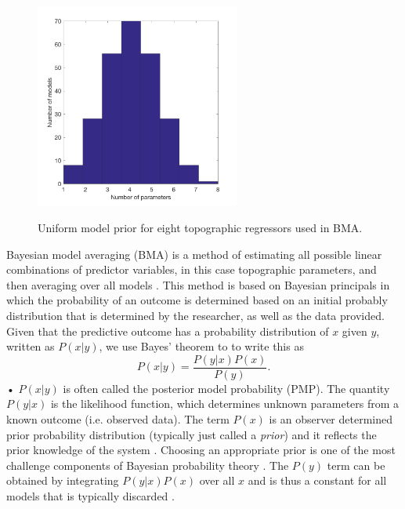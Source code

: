 \documentclass{sfuthesis}
\begin{document}
\begin{figure}
	\centering
	\includegraphics[width = 0.6\textwidth]{DistributionOfNumParams_topoRegress.png}\\
	\caption{Uniform model prior for eight topographic regressors used in BMA.}
	\label{fig:uni_model_prior}
\end{figure}

Bayesian model averaging (BMA) is a method of estimating all possible linear combinations of predictor variables, in this case topographic parameters, and then averaging over all models \citep{Raftery1997, Wasserman2000, Raftery2005}.  This method is based on Bayesian principals in which the probability of an outcome is determined based on an initial probably distribution that is determined by the researcher, as well as the data provided. Given that the predictive outcome has a probability distribution of $x$ given $y$, written as $P(x|y)$, we use Bayes' theorem to to write this as
\begin{equation}
P(x|y) = \frac{P(y|x)P(x)}{P(y)}.
\end{equation}•
$P(x|y)$ is often called the posterior model probability (PMP). The quantity $P(y|x)$ is the likelihood function, which determines unknown parameters from a known outcome (i.e. observed data). The term $P(x)$ is an observer determined prior probability distribution (typically just called a \textit{prior}) and it reflects the prior knowledge of the system \citep{Raftery1997}. Choosing an appropriate prior is one of the most challenge components of Bayesian probability theory \citep{Wasserman2000}. The $P(y)$ term can be obtained by integrating $P(y|x)P(x)$ over all $x$ and is thus a constant for all models that is typically discarded \citep{Wasserman2000}. 
\end{document}
